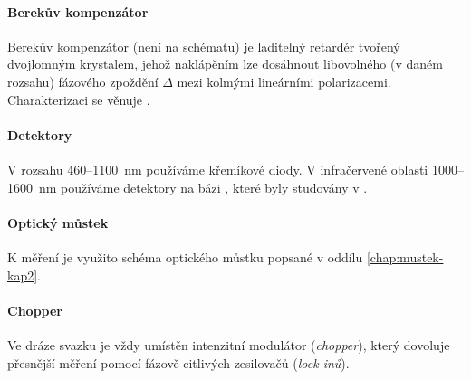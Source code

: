 \paragraph{Berekův kompenzátor}
Berekův kompenzátor (není na schématu) je laditelný retardér tvořený dvojlomným krystalem, jehož naklápěním lze dosáhnout libovolného (v daném rozsahu) fázového zpoždění $\Delta$ mezi kolmými lineárními polarizacemi.
Charakterizaci se věnuje \cite{schusserSkryteKouzloPolarizace2014}.

\paragraph{Detektory}
V rozsahu \num{460}--\SI{1100}{\nano\meter} používáme křemíkové diody.
V infračervené oblasti \num{1000}--\SI{1600}{\nano\meter} používáme detektory na bázi , které byly studovány v \cite{hovorakovaCharakterizaceInfracervenehoDetektoru}.

\paragraph{Optický můstek}
K měření je využito schéma optického můstku popsané v oddílu \ref{chap:mustek-kap2}.

\paragraph{Chopper}
Ve dráze svazku je vždy umístěn intenzitní modulátor (\emph{chopper}), který dovoluje přesnější měření pomocí fázově citlivých zesilovačů (\emph{lock-inů}).
